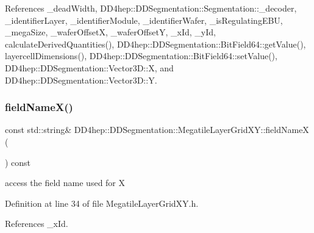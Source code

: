 References \+\_\+dead\+Width, D\+D4hep\+::\+D\+D\+Segmentation\+::\+Segmentation\+::\+\_\+decoder, \+\_\+identifier\+Layer, \+\_\+identifier\+Module, \+\_\+identifier\+Wafer, \+\_\+is\+Regulating\+E\+BU, \+\_\+mega\+Size, \+\_\+wafer\+OffsetX, \+\_\+wafer\+OffsetY, \+\_\+x\+Id, \+\_\+y\+Id, calculate\+Derived\+Quantities(), D\+D4hep\+::\+D\+D\+Segmentation\+::\+Bit\+Field64\+::get\+Value(), layercell\+Dimensions(), D\+D4hep\+::\+D\+D\+Segmentation\+::\+Bit\+Field64\+::set\+Value(), D\+D4hep\+::\+D\+D\+Segmentation\+::\+Vector3\+D\+::X, and D\+D4hep\+::\+D\+D\+Segmentation\+::\+Vector3\+D\+::Y.

\hypertarget{class_d_d4hep_1_1_d_d_segmentation_1_1_megatile_layer_grid_x_y_a7cf0375cf22dcf10a668e6fe87cda777}{}\label{class_d_d4hep_1_1_d_d_segmentation_1_1_megatile_layer_grid_x_y_a7cf0375cf22dcf10a668e6fe87cda777} 
\subsubsection{\texorpdfstring{field\+Name\+X()}{fieldNameX()}}
{\footnotesize\ttfamily const std\+::string\& D\+D4hep\+::\+D\+D\+Segmentation\+::\+Megatile\+Layer\+Grid\+X\+Y\+::field\+NameX (\begin{DoxyParamCaption}{ }\end{DoxyParamCaption}) const\hspace{0.3cm}{\ttfamily [inline]}}



access the field name used for X 



Definition at line 34 of file Megatile\+Layer\+Grid\+X\+Y.\+h.



References \+\_\+x\+Id.

\hypertarget{class_d_d4hep_1_1_d_d_segmentation_1_1_megatile_layer_grid_x_y_a791434189dbb5aa773f6c9dc2b64f504}{}\label{class_d_d4hep_1_1_d_d_segmentation_1_1_megatile_layer_grid_x_y_a791434189dbb5aa773f6c9dc2b64f504} 
